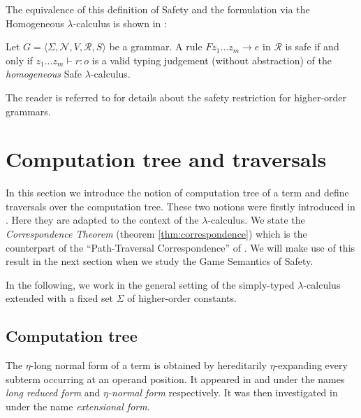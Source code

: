 \documentclass{llncs}
\begin{document}
The equivalence of this definition of Safety and the formulation via the Homogeneous $\lambda$-calculus is shown in \cite{demirandathesis}:
\begin{proposition} Let $G = \langle \Sigma, \mathcal{N}, V, \mathcal{R}, S \rangle$ be a grammar.
A rule $F z_1 \ldots z_m \rightarrow e$ in $\mathcal{R}$ is safe if and only if
$ z_1 \ldots z_m \vdash r : o$
is a valid typing judgement (without abstraction) of the \emph{homogeneous} Safe $\lambda$-calculus.
\end{proposition}


The reader is referred to \cite{KNU02,demirandathesis,safety-mirlong2004}
for details about the safety restriction for higher-order grammars.









\section{Computation tree and traversals}
\label{sec:correspondence}

In this section we introduce the notion of computation tree of a term and
define traversals over the computation tree. These two notions were firstly introduced in \cite{OngLics2006}. Here they
are adapted to the context of the $\lambda$-calculus. We state the \emph{Correspondence Theorem} (theorem \ref{thm:correspondence}) which is the counterpart of the ``Path-Traversal Correspondence''
of \cite{OngLics2006}. We will make use of this result in the next section when we study the
Game Semantics of Safety.

In the following, we work in the general setting of the simply-typed
$\lambda$-calculus extended with a fixed set $\Sigma$ of
higher-order constants.


\subsection{Computation tree}

The $\eta$-long normal form of a term is obtained by hereditarily $\eta$-expanding every
subterm occurring at an operand position.
It appeared in \cite{DBLP:journals/tcs/JensenP76} and
\cite{DBLP:journals/tcs/Huet75} under the names \emph{long reduced
form} and \emph{$\eta$-normal form} respectively. It was then
investigated in \cite{huet76} under the name \emph{extensional form}.
\end{document}
